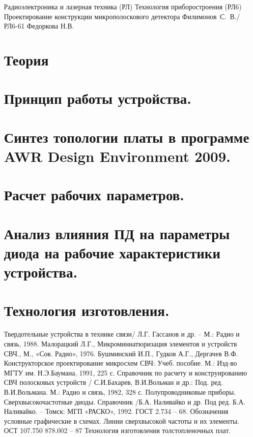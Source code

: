 \documentclass{bmstu}
\begin{document}
	\makecourseworktitle
	{Радиоэлектроника и лазерная техника (РЛ)} %
	{Технология приборостроения (РЛ6)} %
	{Проектирование конструкции микрополоскового детектора} %
	{Филимонов~С.~В./РЛ6-61} %
	{Федоркова Н.В.} %
	{}
	
	\tableofcontents

	\chapter{Теория}
	
	\chapter{Принцип работы устройства.}
	
	\chapter{Синтез топологии платы в программе AWR Design Environment 2009.}
	
	\chapter{Расчет рабочих параметров.}
	
	\chapter{Анализ влияния ПД на параметры диода на рабочие характеристики устройства.}
	
	\chapter{Технология изготовления.} 
	
	
	\begin{thebibliography}{}
		 Твердотельные устройства в технике связи/ Л.Г. Гассанов и др. – М.: Радио и связь, 1988.
		 Малорацкий Л.Г., Микроминиатюризация элементов и устройств СВЧ., М., «Сов. Радио», 1976.
		 Бушминский И.П., Гудков А.Г., Дергачев В.Ф. Конструкторское проектирование микросхем СВЧ: Учеб. пособие. М.: Изд-во МГТУ им. Н.Э.Баумана, 1991, 225 с.
		 Справочник по расчету и конструированию СВЧ полосковых устройств / С.И.Бахарев, В.И.Вольман и др.: Под. ред. В.И.Вольмана. М.: Радио и связь, 1982, 328 с.
		 Полупроводниковые приборы. Сверхвысокочастотные диоды. Справочник /Б.А. Наливайко и др. Под ред. Б.А. Наливайко. – Томск: МГП «РАСКО», 1992.
		 ГОСТ 2.734 – 68. Обозначения условные графические в схемах. Линии сверхвысокой частоты и их элементы.
		 ОСТ 107.750 878.002 – 87   Технология изготовления толстопленочных плат.
	\end{thebibliography}
	
\end{document}
